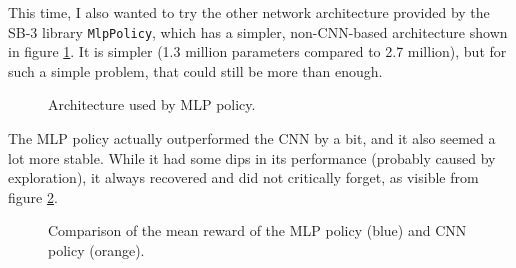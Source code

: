 \documentclass[
  digital,     %
  oneside,     %
  nosansbold,  %
  nocolorbold, %
  lof,         %
  lot,         %
]{fithesis4}
\begin{document}
This time, I also wanted to try the other network architecture provided by the SB-3 library \verb|MlpPolicy|, which has a simpler, non-CNN-based architecture shown in figure \ref{fig:mlp_policy}. It is simpler (1.3 million parameters compared to 2.7 million), but for such a simple problem, that could still be more than enough.

\begin{figure}
    \caption{Architecture used by MLP policy.}
    \label{fig:mlp_policy}
\end{figure}

The MLP policy actually outperformed the CNN by a bit, and it also seemed a lot more stable. While it had some dips in its performance (probably caused by exploration), it always recovered and did not critically forget, as visible from figure \ref{fig:v2_mlp_cnn}.

\begin{figure}
    \centering
    \makebox[\textwidth][c]{}
    \caption{Comparison of the mean reward of the MLP policy (blue) and CNN policy (orange).}
    \label{fig:v2_mlp_cnn}
\end{figure}
\end{document}
